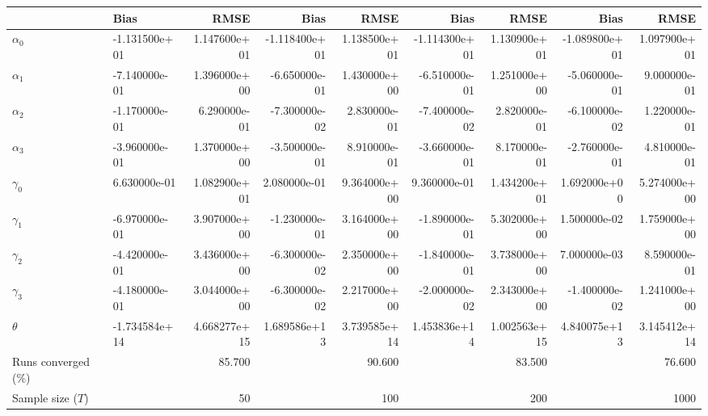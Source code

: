 
\begin{tabular}[t]{llrrrrrrr}
\toprule
  & Bias & RMSE & Bias & RMSE & Bias & RMSE & Bias & RMSE\\
\midrule
$\alpha_{0}$ & -1.131500e+01 & 1.147600e+01 & -1.118400e+01 & 1.138500e+01 & -1.114300e+01 & 1.130900e+01 & -1.089800e+01 & 1.097900e+01\\
$\alpha_{1}$ & -7.140000e-01 & 1.396000e+00 & -6.650000e-01 & 1.430000e+00 & -6.510000e-01 & 1.251000e+00 & -5.060000e-01 & 9.000000e-01\\
$\alpha_{2}$ & -1.170000e-01 & 6.290000e-01 & -7.300000e-02 & 2.830000e-01 & -7.400000e-02 & 2.820000e-01 & -6.100000e-02 & 1.220000e-01\\
$\alpha_{3}$ & -3.960000e-01 & 1.370000e+00 & -3.500000e-01 & 8.910000e-01 & -3.660000e-01 & 8.170000e-01 & -2.760000e-01 & 4.810000e-01\\
$\gamma_{0}$ & 6.630000e-01 & 1.082900e+01 & 2.080000e-01 & 9.364000e+00 & 9.360000e-01 & 1.434200e+01 & 1.692000e+00 & 5.274000e+00\\
$\gamma_{1}$ & -6.970000e-01 & 3.907000e+00 & -1.230000e-01 & 3.164000e+00 & -1.890000e-01 & 5.302000e+00 & 1.500000e-02 & 1.759000e+00\\
$\gamma_{2}$ & -4.420000e-01 & 3.436000e+00 & -6.300000e-02 & 2.350000e+00 & -1.840000e-01 & 3.738000e+00 & 7.000000e-03 & 8.590000e-01\\
$\gamma_{3}$ & -4.180000e-01 & 3.044000e+00 & -6.300000e-02 & 2.217000e+00 & -2.000000e-02 & 2.343000e+00 & -1.400000e-02 & 1.241000e+00\\
$\theta$ & -1.734584e+14 & 4.668277e+15 & 1.689586e+13 & 3.739585e+14 & 1.453836e+14 & 1.002563e+15 & 4.840075e+13 & 3.145412e+14\\
Runs converged (\%) &  & 85.700 &  & 90.600 &  & 83.500 &  & 76.600\\
Sample size ($T$) &  & 50 &  & 100 &  & 200 &  & 1000\\
\bottomrule
\end{tabular}
